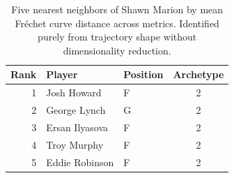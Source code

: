 \begin{table}[htbp]
  \centering\small
  \begin{tabular}{rllc}
    \toprule
    Rank & Player & Position & Archetype \\
    \midrule
    1 & Josh Howard & F & 2 \\
    2 & George Lynch & G & 2 \\
    3 & Ersan Ilyasova & F & 2 \\
    4 & Troy Murphy & F & 2 \\
    5 & Eddie Robinson & F & 2 \\
    \bottomrule
  \end{tabular}
  \caption{Five nearest neighbors of Shawn Marion by mean Fr\'{e}chet curve distance across metrics. Identified purely from trajectory shape without dimensionality reduction.}
  \label{tab:Shawn_Marion_frechet_curve_neighbors}
\end{table}


